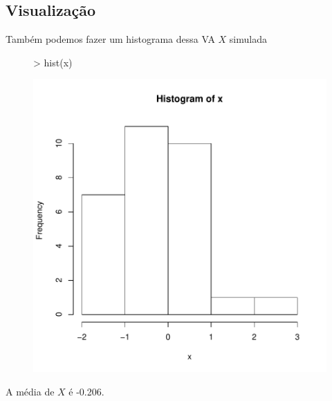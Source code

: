 \documentclass{article}
\begin{document}
\subsection{Visualização}

Também podemos fazer um histograma dessa VA $X$ simulada

\begin{figure}
\begin{Schunk}
\begin{Sinput}
> hist(x)
\end{Sinput}
\end{Schunk}
\includegraphics{Exemplo0-Sweave-histm}
\end{figure}

A média de $X$ é -0.206.
\end{document}
